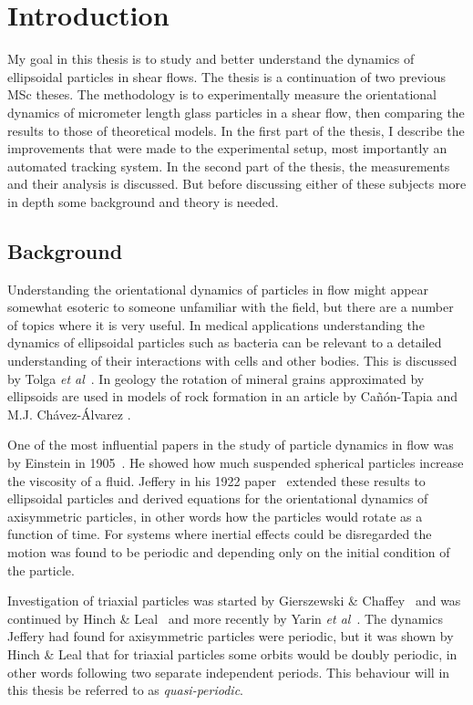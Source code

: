 \section{Introduction}
My goal in this thesis is to study and better understand the dynamics of ellipsoidal particles in shear flows. The thesis is a continuation of two previous MSc theses\cite{AntonThesis, JonasThesis}. The methodology is to experimentally measure the orientational dynamics of micrometer length glass particles in a shear flow, then comparing the results to those of theoretical models. In the first part of the thesis, I describe the improvements that were made to the experimental setup, most importantly an automated tracking system. In the second part of the thesis, the measurements and their analysis is discussed. But before discussing either of these subjects more in depth some background and theory is needed.

\subsection{Background}
Understanding the orientational dynamics of particles in flow might appear somewhat esoteric to someone unfamiliar with the field, but there are a number of topics where it is very useful. In medical applications understanding the dynamics of ellipsoidal particles such as bacteria can be relevant to a detailed understanding of their interactions with cells and other bodies. This is discussed by Tolga \emph{et al}~\cite{Tolga}. In geology the rotation of mineral grains approximated by ellipsoids are used in models of rock formation in an article by Cañón-Tapia and M.J. Chávez-Álvarez \cite{geology}.

One of the most influential papers in the study of particle dynamics in flow was by Einstein in 1905~\cite{Einstein}. He showed how much suspended spherical particles increase the viscosity of a fluid. Jeffery in his 1922 paper~\cite{Jeffery} extended these results to ellipsoidal  particles and derived equations for the orientational dynamics of axisymmetric particles, in other words how the particles would rotate as a function of time. For systems where inertial effects could be disregarded the motion was found to be periodic and depending only on the initial condition of the particle. 

Investigation of triaxial particles was started by Gierszewski \& Chaffey~\cite{Chaffey} and was continued by Hinch \& Leal~\cite{Leal} and more recently by Yarin \emph{et al}~\cite{Yarin}. 
The dynamics Jeffery had found for axisymmetric particles were periodic, but it was shown by Hinch \& Leal that for triaxial particles some orbits would be doubly periodic, in other words following two separate independent periods. This behaviour will in this thesis be referred to as \emph{quasi-periodic}.

